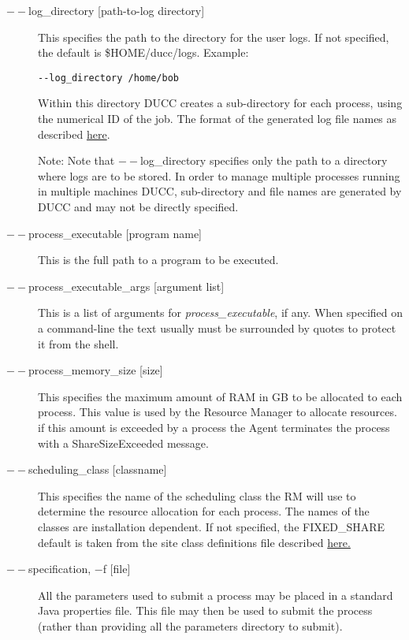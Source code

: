 \begin{description}
        \item[$--$log\_directory {[path-to-log directory]} ]

          This specifies the path to the directory for the user logs. If not specified, the default
          is \$HOME/ducc/logs. Example: 
\begin{verbatim}
--log_directory /home/bob 
\end{verbatim}
          
          Within this directory DUCC creates a sub-directory for each process, using the numerical 
          ID of the job. The format of the generated log file names as described
          \hyperref[chap:job-logs]{here}.
          
          Note: Note that $--$log\_directory specifies only the path to a directory where 
          logs are to be stored. In order to manage multiple processes running in multiple 
          machines DUCC, sub-directory and file names are generated by DUCC and may 
          not be directly specified. 

        \item[$--$process\_executable {[program name]}] This is the full path to a program to be
          executed.

        \item[$--$process\_executable\_args {[argument list]}] This is a list of arguments for
          {\em process\_executable}, if any.   When specified on a command-line the text usually must be
          surrounded by quotes to protect it from the shell.

        \item[$--$process\_memory\_size {[size]} ] This specifies the maximum amount of RAM in GB to
          be allocated to each process.  This value is used by the Resource Manager to allocate
          resources. if this amount is exceeded by a process the Agent terminates the process with a
          ShareSizeExceeded message.

        \item[$--$scheduling\_class {[classname]} ] This specifies the name of the scheduling class the
          RM will use to determine the resource allocation for each process. The names of the
          classes are installation dependent.
          If not specified, the FIXED\_SHARE default is taken from the site class definitions file
          described \hyperref[subsubsec:class.configuration]{here.} 

        \item[$--$specification, $-$f {[file]} ] All the parameters used to submit a process may be placed
          in a standard Java properties file.  This file may then be used to submit the process
          (rather than providing all the parameters directory to submit).
          

\end{description}
